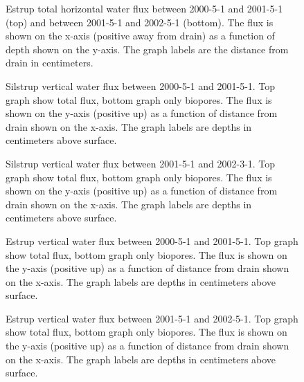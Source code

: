 \begin{figure}[htbp]
  \centering
  
  \caption{Estrup total horizontal water flux between 2000-5-1 and
    2001-5-1 (top) and between 2001-5-1 and 2002-5-1 (bottom).  The
    flux is shown on the x-axis (positive away from drain) as a
    function of depth shown on the y-axis.  The graph labels are the
    distance from drain in centimeters.}
  \label{fig:Estrup-water-horizontal}
\end{figure}

\begin{figure}[htbp]
  \centering
  
  \caption{Silstrup vertical water flux between 2000-5-1 and
    2001-5-1.  Top graph show total flux, bottom graph only biopores.  The flux is shown on the y-axis (positive up) as a
    function of distance from drain shown on the x-axis.  The graph
    labels are depths in centimeters above surface.}
  \label{fig:Silstrup-water-2000}
\end{figure}

\begin{figure}[htbp]
  \centering
  
  \caption{Silstrup vertical water flux between 2001-5-1 and 2002-3-1.
    Top graph show total flux, bottom graph only biopores.  The flux
    is shown on the y-axis (positive up) as a function of distance
    from drain shown on the x-axis.  The graph labels are depths in
    centimeters above surface.}
  \label{fig:Silstrup-water-2001}
\end{figure}

\begin{figure}[htbp]
  \centering
  
  \caption{Estrup vertical water flux between 2000-5-1 and 2001-5-1.
    Top graph show total flux, bottom graph only biopores. The flux is
    shown on the y-axis (positive up) as a function of distance from
    drain shown on the x-axis.  The graph labels are depths in
    centimeters above surface.}
  \label{fig:Estrup-water-2000}
\end{figure}

\begin{figure}[htbp]
  \centering
  
  \caption{Estrup vertical water flux between 2001-5-1 and 2002-5-1.
    Top graph show total flux, bottom graph only biopores. The flux is
    shown on the y-axis (positive up) as a function of distance from
    drain shown on the x-axis.  The graph labels are depths in
    centimeters above surface.}
  \label{fig:Estrup-water-2001}
\end{figure}

